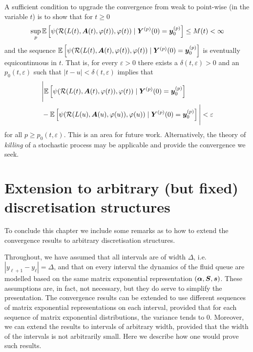 A sufficient condition to upgrade the convergence from weak to point-wise (in the variable \(t\)) is to show that for \(t\geq 0\) 
\[\sup_{p}\mathbb E\left[\psi( \mathcal R(L(t),\boldsymbol A(t),\varphi(t)),\varphi(t) )  \mid \boldsymbol Y^{(p)}(0)=\boldsymbol y_0^{(p)} \right]  \leq M(t)<\infty\]
and the sequence \(\mathbb E\left[\psi( \mathcal R(L(t),\boldsymbol A(t),\varphi(t)),\varphi(t) )   \mid \boldsymbol Y^{(p)}(0)=\boldsymbol y_0^{(p)} \right]  \) is eventually equicontinuous in \(t\). That is, for every \(\varepsilon>0\) there exists a \(\delta(t,\varepsilon)>0\) and an \(p_0(t,\varepsilon)\) such that \(|t-u|<\delta(t,\varepsilon)\) implies that 
\begin{align}
	&\nonumber \Bigg|\mathbb E\left[\psi( \mathcal R(L(t),\boldsymbol A(t),\varphi(t)),\varphi(t) )   \mid \boldsymbol Y^{(p)}(0)=\boldsymbol y_0^{(p)} \right] 
	\\&{}-\mathbb E\left[\psi( \mathcal R(L(u),\boldsymbol A(u),\varphi(u)),\varphi(u) )   \mid \boldsymbol Y^{(p)}(0)=\boldsymbol y_0^{(p)}\right] \Bigg| \nonumber 
	<\varepsilon
\end{align}
for all \(p\geq p_0(t,\varepsilon)\). This is an area for future work. Alternatively, the theory of \emph{killing} of a stochastic process may be applicable and provide the convergence we seek. 


\section{Extension to arbitrary (but fixed) discretisation structures}
To conclude this chapter we include some remarks as to how to extend the convergence results to arbitrary discretisation structures. 

Throughout, we have assumed that all intervals are of width \(\Delta\), i.e.~\(|y_{\ell+1}-y_\ell|=\Delta\), and that on every interval the dynamics of the fluid queue are modelled based on the same matrix exponential representation \((\boldsymbol \alpha, \boldsymbol S, \boldsymbol s)\). These assumptions are, in fact, not necessary, but they do serve to simplify the presentation. The convergence results can be extended to use different sequences of matrix exponential representations on each interval, provided that for each sequence of matrix exponential distributions, the variance tends to \(0\). Moreover, we can extend the results to intervals of arbitrary width, provided that the width of the intervals is not arbitrarily small. Here we describe how one would prove such results.

